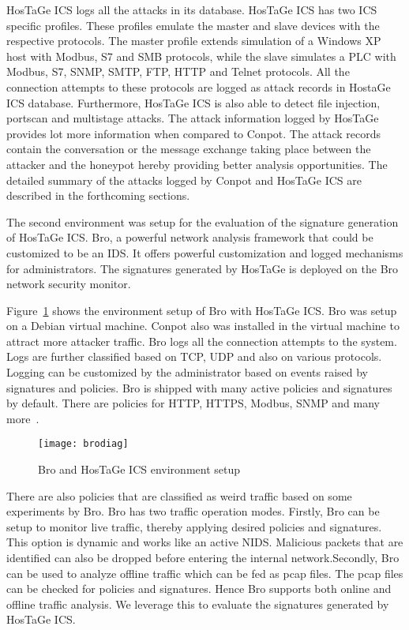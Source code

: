 \documentclass[article,msc=informatik,type=msc,colorback,accentcolor=tud9c]{tudthesis}
\begin{document}
 	\vspace{3mm}
 	HosTaGe ICS logs all the attacks in its database. HosTaGe ICS has two \ac{ICS} specific profiles. These profiles emulate the master and slave devices with the respective protocols. The master profile extends simulation of a Windows XP host with Modbus, S7 and SMB protocols, while the slave simulates a \ac{PLC} with Modbus, S7, SNMP, SMTP, FTP, HTTP and Telnet protocols. All the connection attempts to these protocols are logged as attack records in HostaGe ICS database. Furthermore, HosTaGe ICS is also able to detect file injection, portscan and multistage attacks. The attack information logged by HosTaGe provides lot more information when compared to Conpot. The attack records contain the conversation or the message exchange taking place between the attacker and the honeypot hereby providing better analysis opportunities. The detailed summary of the attacks logged by Conpot and HosTaGe ICS are described in the forthcoming sections. 
 	
 	\vspace{3mm}
 	The second environment was setup for the evaluation of the signature generation of HosTaGe ICS. Bro, a powerful network analysis framework that could be customized to be an IDS. It offers powerful customization and logged mechanisms for administrators. The signatures generated by HosTaGe is deployed on the Bro network security monitor. 
 	
 	\vspace{3mm}
 	Figure~\ref{Bro and HosTaGe ICS environment setup} shows the environment setup of Bro with HosTaGe ICS. Bro was setup on a Debian virtual machine. Conpot also was installed in the virtual machine to attract more attacker traffic. Bro logs all the connection attempts to the system. Logs are further classified based on TCP, UDP and also on various protocols. Logging can be customized by the administrator based on events raised by signatures and policies. Bro is shipped with many active policies and signatures by default. There are policies for HTTP, HTTPS, Modbus, SNMP and many more~\cite{Bro}. 
 	
 	\begin{figure}[H]
 	 			\centering
 	 			\texttt{[image: brodiag]}
 	 			\caption[Bro and HosTaGe ICS environment setup]{\label{Bro and HosTaGe ICS environment setup}Bro and HosTaGe ICS environment setup}
 	\end{figure}
 	
 	
 	There are also policies that are classified as weird traffic based on some experiments by Bro. Bro has two traffic operation modes. Firstly, Bro can be setup to monitor live traffic, thereby applying desired policies and signatures. This option is dynamic and works like an active \ac{NIDS}. Malicious packets that are identified can also be dropped before entering the internal network.Secondly, Bro can be used to analyze offline traffic which can be fed as pcap files. The pcap files can be checked for policies and signatures. Hence Bro supports both online and offline traffic analysis. We leverage this to evaluate the signatures generated by HosTaGe ICS.
 	
\end{document}
